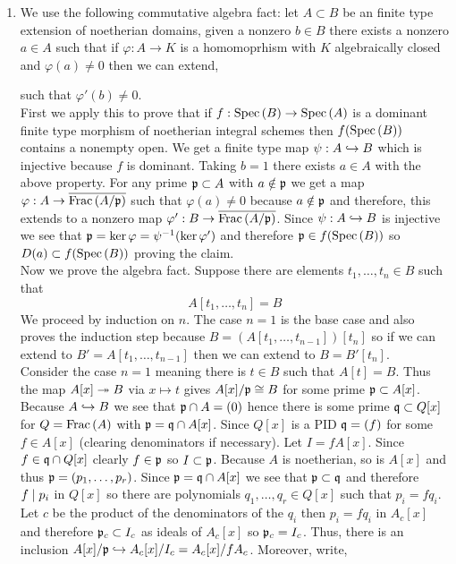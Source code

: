 \documentclass[12pt]{article}
\begin{document}
\begin{enumerate}
\item We use the following commutative algebra fact: let $A \subset B$ be an finite type extension of noetherian domains, given a nonzero $b \in B$ there exists a nonzero $a \in A$ such that if $\varphi : A \to K$ is a homomoprhism with $K$ algebraically closed and $\varphi(a) \neq 0$ then we can extend,
\begin{center}
\end{center}
such that $\varphi'(b) \neq 0$.
\bigskip\\
First we apply this to prove that if $f : \mathrm{Spec}\left( B \right) \to \mathrm{Spec}\left( A \right)$ is a dominant finite type morphism of noetherian integral schemes then $f(\mathrm{Spec}\left( B \right))$ contains a nonempty open. We get a finite type map $\psi : A \hookrightarrow B$ which is injective because $f$ is dominant. Taking $b = 1$ there exists $a \in A$ with the above property. For any prime $\mathfrak{p} \subset A$ with $a \notin \mathfrak{p}$ we get a map $\varphi : A \to \overline{\mathrm{Frac}\left(A/\mathfrak{p}\right)}$ such that $\varphi(a) \neq 0$ because $a \notin \mathfrak{p}$ and therefore, this extends to a nonzero map $\varphi' : B \to \overline{\mathrm{Frac}\left(A/\mathfrak{p}\right)}$. Since $\psi : A \hookrightarrow B$ is injective we see that $\mathfrak{p} = \ker{\varphi} = \psi^{-1}(\ker{\varphi'})$ and therefore $\mathfrak{p} \in f(\mathrm{Spec}\left( B \right))$ so $D(a) \subset f(\mathrm{Spec}\left( B \right))$ proving the claim.
\bigskip\\
Now we prove the algebra fact. Suppose there are elements $t_1, \dots, t_n \in B$ such that 
\[ A[t_1, \dots, t_n] = B \]
We proceed by induction on $n$. The case $n = 1$ is the base case and also proves the induction step because $B = (A[t_1, \dots, t_{n-1}])[t_n]$ so if we can extend to $B' = A[t_1, \dots, t_{n-1}]$ then we can extend to $B = B'[t_n]$.
\bigskip\\
Consider the case $n = 1$ meaning there is $t \in B$ such that $A[t] = B$. Thus the map $A[x] \twoheadrightarrow B$ via $x \mapsto t$ gives $A[x]/\mathfrak{p} \cong B$ for some prime $\mathfrak{p} \subset A[x]$. Because $A \hookrightarrow B$ we see that $\mathfrak{p} \cap A = (0)$ hence there is some prime $\mathfrak{q} \subset Q[x]$ for $Q = \mathrm{Frac}\left(A\right)$ with $\mathfrak{p} = \mathfrak{q} \cap A[x]$. Since $Q[x]$ is a PID $\mathfrak{q} = (f)$ for some $f \in A[x]$ (clearing denominators if necessary). Let $I = f A[x]$. Since $f \in \mathfrak{q} \cap Q[x]$ clearly $f \in \mathfrak{p}$ so $I \subset \mathfrak{p}$. Because $A$ is noetherian, so is $A[x]$ and thus $\mathfrak{p} = (p_1, \dots, p_r)$. Since $\mathfrak{p} = \mathfrak{q} \cap A[x]$ we see that $\mathfrak{p} \subset \mathfrak{q}$ and therefore $f \mid p_i$ in $Q[x]$ so there are polynomials $q_1, \dots, q_r \in Q[x]$ such that $p_i = f q_i$. Let $c$ be the product of the denominators of the $q_i$ then $p_i = f q_i$ in $A_c[x]$ and therefore $\mathfrak{p}_c \subset I_c$ as ideals of $A_c[x]$ so $\mathfrak{p}_c = I_c$. Thus, there is an inclusion $A[x]/\mathfrak{p} \hookrightarrow A_c[x]/I_c = A_c[x] / f A_c$. Moreover, write,

\end{enumerate}
\end{document}
